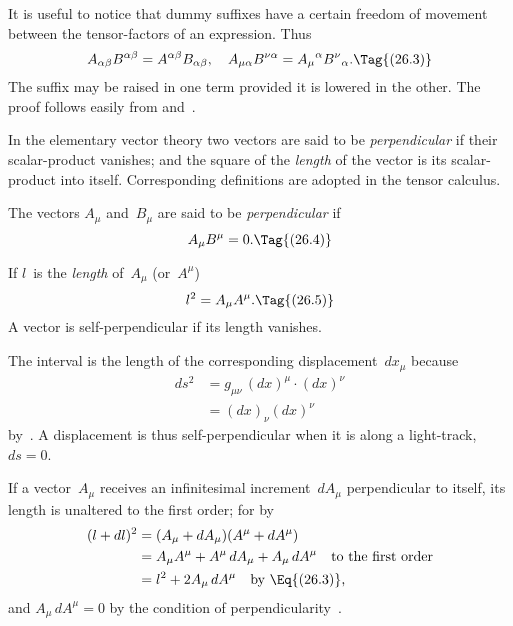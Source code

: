 \documentclass[12pt]{book}
\begin{document}
It is useful to notice that dummy suffixes have a certain freedom of movement
between the tensor\hyp{}factors of an expression. Thus
\[
A_{\alpha\beta} B^{\alpha\beta} = A^{\alpha\beta} B_{\alpha\beta},\quad
A_{\mu\alpha} B^{\nu\alpha} = {A_{\mu}}^{\alpha} {B^{\nu}}_{\alpha}.
\Tag{(26.3)}
\]
The suffix may be raised in one term provided it is lowered in the other.
The proof follows easily from  and~.

In the elementary vector theory two vectors are said to be \emph{perpendicular}
%
%
%
if their scalar\hyp{}product vanishes; and the square of the \emph{length} of the vector is
its scalar\hyp{}product into itself. Corresponding definitions are adopted in the
tensor calculus.

The vectors $A_{\mu}$ and~$B_{\mu}$ are said to be \emph{perpendicular} if
\[
A_{\mu} B^{\mu} = 0.
\Tag{(26.4)}
\]

If $l$~is the \emph{length} of~$A_{\mu}$ (or~$A^{\mu}$)
\[
l^{2} = A_{\mu} A^{\mu}.
\Tag{(26.5)}
\]
A vector is self\hyp{}perpendicular if its length vanishes.

The interval is the length of the corresponding displacement~$dx_{\mu}$ because
\begin{align*}
  ds^{2} &= g_{\mu\nu}\, (dx)^{\mu} \cdot (dx)^{\nu} \\
  &= (dx)_{\nu} (dx)^{\nu}
\end{align*}
by~. A displacement is thus self\hyp{}perpendicular when it is along a
light-track, $ds = 0$.

If a vector~$A_{\mu}$ receives an infinitesimal increment~$dA_{\mu}$ perpendicular to
itself, its length is unaltered to the first order; for by~
\begin{align*}
  (l + dl)^{2}
  &= (A_{\mu} + dA_{\mu}) (A^{\mu} + dA^{\mu}) \\
  &= A_{\mu} A^{\mu} + A^{\mu}\, dA_{\mu} + A_{\mu}\, dA^{\mu}\quad\text{to the first order} \\
  &= l^{2} + 2A_{\mu}\, dA^{\mu} \quad\text{by~\Eq{(26.3)},}
\end{align*}
and $A_{\mu}\, dA^{\mu} = 0$ by the condition of perpendicularity~.
\end{document}
